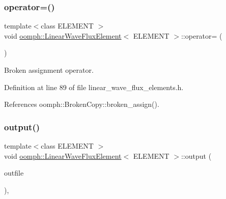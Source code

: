 \mbox{\label{classoomph_1_1LinearWaveFluxElement_a9b7ef9dfc2f7781275a7f31194bc5093}} 
\subsubsection{\texorpdfstring{operator=()}{operator=()}}
{\footnotesize\ttfamily template$<$class E\+L\+E\+M\+E\+NT $>$ \\
void \hyperlink{classoomph_1_1LinearWaveFluxElement}{oomph\+::\+Linear\+Wave\+Flux\+Element}$<$ E\+L\+E\+M\+E\+NT $>$\+::operator= (\begin{DoxyParamCaption}\item[{const \hyperlink{classoomph_1_1LinearWaveFluxElement}{Linear\+Wave\+Flux\+Element}$<$ E\+L\+E\+M\+E\+NT $>$ \&}]{ }\end{DoxyParamCaption})\hspace{0.3cm}{\ttfamily [inline]}}



Broken assignment operator. 



Definition at line 89 of file linear\+\_\+wave\+\_\+flux\+\_\+elements.\+h.



References oomph\+::\+Broken\+Copy\+::broken\+\_\+assign().

\mbox{\label{classoomph_1_1LinearWaveFluxElement_ad969d2df96dd76f0cab08ad7a80dda9f}} 
\subsubsection{\texorpdfstring{output()}{output()}\hspace{0.1cm}{\footnotesize\ttfamily [1/4]}}
{\footnotesize\ttfamily template$<$class E\+L\+E\+M\+E\+NT $>$ \\
void \hyperlink{classoomph_1_1LinearWaveFluxElement}{oomph\+::\+Linear\+Wave\+Flux\+Element}$<$ E\+L\+E\+M\+E\+NT $>$\+::output (\begin{DoxyParamCaption}\item[{std\+::ostream \&}]{outfile }\end{DoxyParamCaption})\hspace{0.3cm}{\ttfamily [inline]}, {\ttfamily [virtual]}}

